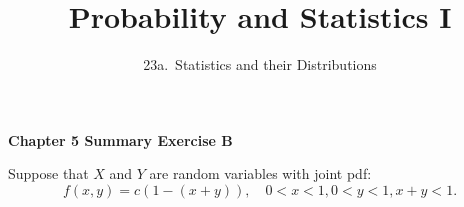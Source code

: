 

\hypersetup{
  colorlinks=true,
  linkcolor=blue,
  filecolor=magenta,      
  urlcolor=blue,
}
  
\newcommand{\lecturenum}{23a}

\title[SS2857]{Probability and Statistics I}
\subtitle{\lecturenum.~Statistics and their Distributions}

\date{}






{

\begin{frame}
  \addtocounter{framenumber}{-1}

  \maketitle
\end{frame}
}

\begin{frame}
  \frametitle{}
  
  \begin{center}
    \Large{\textbf{Chapter 5 Summary Exercise B}}

    \bigskip

  \end{center}
  
\end{frame}

\begin{frame}

\begin{block}{\example}
Suppose that $X$ and $Y$ are random variables with joint pdf:
$$
f(x,y)=c(1-(x+y)), \quad  0< x <1, 0<y<1, x+y<1.
$$
\end{block}
\end{frame}



